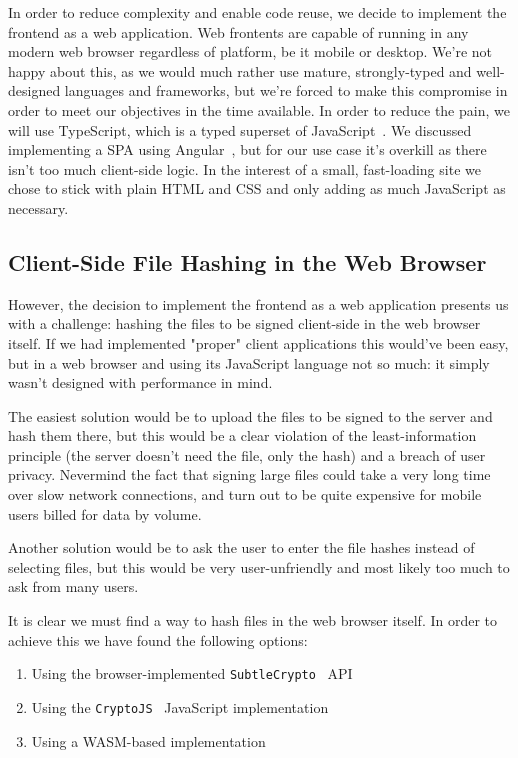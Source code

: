 In order to reduce complexity and enable code reuse, we decide to implement the frontend as a web application.
Web frontents are capable of running in any modern web browser regardless of platform, be it mobile or desktop.
We're not happy about this, as we would much rather use mature, strongly-typed and well-designed languages and frameworks,
but we're forced to make this compromise in order to meet our objectives in the time available.
In order to reduce the pain, we will use TypeScript, which is a typed superset of JavaScript~\cite{loltypes}.
We discussed implementing a \gls{SPA} using Angular~\cite{angular},
but for our use case it's overkill as there isn't too much client-side logic.
In the interest of a small, fast-loading site we chose to stick with plain \gls{HTML} and \gls{CSS}
and only adding as much JavaScript as necessary.

\subsection{Client-Side File Hashing in the Web Browser}
\label{subsec:browserhashing}
However, the decision to implement the frontend as a web application presents us with a challenge:
hashing the files to be signed client-side in the web browser itself.
If we had implemented "proper" client applications this would've been easy, but in a web browser and using its
JavaScript language not so much: it simply wasn't designed with performance in mind.

The easiest solution would be to upload the files to be signed to the server and hash them there,
but this would be a clear violation of the least-information principle (the server doesn't need the file, only the hash)
and a breach of user privacy.
Nevermind the fact that signing large files could take a very long time over slow network connections,
and turn out to be quite expensive for mobile users billed for data by volume.

Another solution would be to ask the user to enter the file hashes instead of selecting files,
but this would be very user-unfriendly and most likely too much to ask from many users.

It is clear we must find a way to hash files in the web browser itself.
In order to achieve this we have found the following options:

\begin{enumerate}
    \item Using the browser-implemented \texttt{SubtleCrypto}~\cite{subtlecrypto} \gls{API}
    \item Using the \texttt{CryptoJS}~\cite{cryptojs} JavaScript implementation
    \item Using a \gls{WASM}-based implementation
\end{enumerate}

